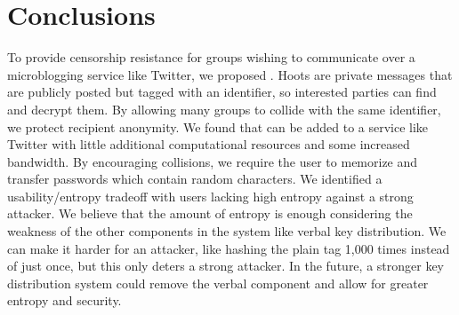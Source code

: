 \section{Conclusions}

To provide censorship resistance for groups wishing to communicate over a microblogging service like Twitter, we proposed \hoot. Hoots are private messages that are publicly posted but tagged with an identifier, so interested parties can find and decrypt them. By allowing many groups to collide with the same identifier, we protect recipient anonymity. We found that \hoot can be added to a service like Twitter with little additional computational resources and some increased bandwidth. By encouraging collisions, we require the user to memorize and transfer passwords which contain random characters. We identified a usability/entropy tradeoff with users lacking high entropy against a strong attacker. We believe that the amount of entropy is enough considering the weakness of the other components in the system like verbal key distribution. We can make it harder for an attacker, like hashing the plain tag 1,000 times instead of just once, but this only deters a strong attacker. In the future, a stronger key distribution system could remove the verbal component and allow for greater entropy and security.
